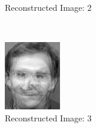 \documentclass[12pt]{article}
\begin{document}
\begin{figure}
\begin{subfigure}[b]{0.20\textwidth}
		\caption{Reconstructed Image: 2}
	\end{subfigure}\\
	\begin{subfigure}[b]{0.20\textwidth}
		\includegraphics[width=\textwidth]{Task4.6_Images/ReconstructedImage3.jpg}
		\caption{Reconstructed Image: 3}
	\end{subfigure}\quad
	\begin{subfigure}[b]{0.20\textwidth}

\end{subfigure}
\end{figure}
\end{document}
